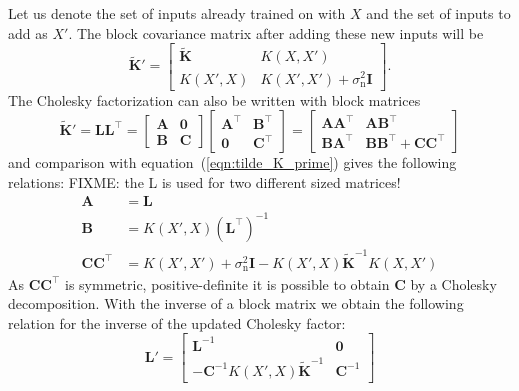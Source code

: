 \documentclass[11pt,a4paper]{scrreprt}
\newcommand{\mat}[1]{\bm{#1}}
\newcommand{\T}{^{\top}}
\begin{document}
Let us denote the set of inputs already trained on with $X$ and the set of 
inputs to add as $X'$. The block covariance matrix after adding these new inputs 
will be
\begin{equation} \label{eqn:tilde_K_prime}
    \tilde{\mat K}' = \left[ \begin{array}{cc}
            \tilde{\mat K} & K(X, X') \\ K(X', X) & K(X', X') 
            + \sigma_{\text{n}}^2\mat I
        \end{array}
    \right]\text{.}
\end{equation}
The Cholesky factorization can also be written with block matrices
\begin{equation}
    \tilde{\mat K}' = \mat L \mat L\T = \left[
        \begin{array}{cc}
            \mat A & \mat 0 \\ \mat B & \mat C
        \end{array}
    \right] \left[
        \begin{array}{cc}
            \mat A\T & \mat B\T \\ \mat 0 & \mat C\T
        \end{array}
    \right] = \left[
        \begin{array}{cc}
            \mat A \mat A\T & \mat A \mat B\T \\ \mat B \mat A\T & \mat B \mat 
            B\T + \mat C \mat C\T
        \end{array}
    \right]
\end{equation}
and comparison with equation~(\ref{eqn:tilde_K_prime}) gives the following 
relations:
FIXME: the L is used for two different sized matrices!
\begin{align}
    \mat A &= \mat L \\
    \mat B &= K(X', X) (\mat L\T)^{-1} \\
    \mat C \mat C\T &= K(X', X') + \sigma_{\text{n}}^2\mat I - K(X', 
    X)\tilde{\mat K}^{-1}K(X, X')
\end{align}
As $\mat C \mat C\T$ is symmetric, positive-definite it is possible to obtain 
$\mat C$ by a Cholesky decomposition.
With the inverse of a block matrix \parencite[45]{Petersen:2008wc} we obtain the 
following relation for the inverse of the updated Cholesky factor:
\begin{equation}
    \mat L' = \left[
        \begin{array}{cc}
            \mat L^{-1} & \mat 0 \\ -\mat C^{-1} K(X', X)\tilde{\mat K}^{-1} 
            & \mat C^{-1}
        \end{array}
    \right]
\end{equation}
\end{document}
